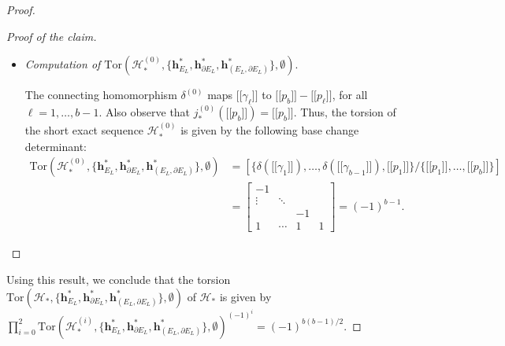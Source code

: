 \documentclass[a4paper]{amsart}
\theoremstyle{plain}
\theoremstyle{definition}
\theoremstyle{remark}
\newcommand{\Tor}[3]{\mathrm{Tor} ({#1}, {#2}, {#3})}
\newcommand{\bbrack}[1]{\lbrack \! \lbrack #1 \rbrack \! \rbrack}
\newcommand{\hbasis}[2][h]{\mathbf{#1}^{#2}}
\newcommand{\hbasisrel}[1]{%
\hbasis{*}_{#1}, \hbasis{*}_{\bord #1}, \hbasis{*}_{(#1, \bord #1)}%
}
\newcommand{\bord}{\partial}
\begin{document}
\begin{proof}
\begin{proof}[Proof of the claim]
\begin{itemize}
      As a conclusion, we have that 
      $$\Tor{\mathcal{H}^{(1)}_*}{\{\hbasisrel{E_L}\}}{\emptyset} =
      (-1)^{b(b-1)/2}.$$

    \item \emph{Computation of
        $\Tor{\mathcal{H}^{(0)}_*}{\{\hbasisrel{E_L}\}}{\emptyset} $}.

      The connecting homomorphism $\delta^{(0)}$ maps $\bbrack{\gamma_\ell}$ to
      $\bbrack{p_b} - \bbrack{p_\ell}$, for all $\ell = 1, \ldots, b-1$. 
      Also observe that $j_*^{(0)}(\bbrack{p_b}) = \bbrack{p_b}$. 
      Thus, the torsion of the short exact sequence
      $\mathcal{H}_*^{(0)}$ is given by the following base change
      determinant:
      \begin{align*}
        \Tor{\mathcal{H}^{(0)}_*}{\{\hbasisrel{E_L}\}}{\emptyset} 
        &= 
          \left[
            \{ 
              \delta(\bbrack{\gamma_1}), \ldots, \delta(\bbrack{\gamma_{b-1}}), 
               \bbrack{p_1}
            \} / \{
              \bbrack{p_1}, \ldots, \bbrack{p_b} 
            \}
            \right]\\
        &= \left[
          \begin{array}{cccc}
            -1  &  & & \\
            \vdots & \ddots &  &  \\
            & & -1 & \\
            1 & \cdots & 1& 1 
          \end{array}
        \right] =(-1)^{b-1}.
      \end{align*}
    \end{itemize}
  \end{proof}
  Using this result, we conclude that the torsion $\Tor{\mathcal{H}_*}{\{\hbasisrel{E_L}\}}{\emptyset}$ of $\mathcal{H}_*$
  is given by
  $\prod_{i=0}^2{\Tor{\mathcal{H}^{(i)}_*}{\{\hbasisrel{E_L}\}}{\emptyset}}^{(-1)^{i}} 
    = (-1)^{b(b-1)/2}.$
\end{proof}



%




\end{document}
